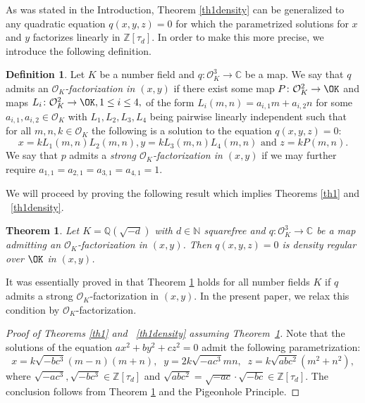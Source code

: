 \documentclass[11pt]{amsart}
\newtheorem{theorem}[lemma]{Theorem}
\theoremstyle{definition}
\newtheorem{definition}[lemma]{Definition}
\newcommand{\C}{{\mathbb C}}
\newcommand{\N}{{\mathbb N}}
\newcommand{\Q}{{\mathbb Q}}
\newcommand{\Z}{{\mathbb Z}}
\begin{document}
As was stated in the Introduction, Theorem \ref{th1density} can be generalized to any quadratic equation $q(x,y,z)=0$ for which the parametrized solutions for $x$ and $y$ factorizes linearly in  $\Z[\tau_{d}]$. In order to make this more precise, we introduce the following definition.
 
\begin{definition}
    Let $K$ be a number field and $q\colon\mathcal{O}_{K}^{3}\to\C$ be a map. We say that $q$ admits an \emph{$\mathcal{O}_{K}$-factorization in $(x,y)$} if there exist some map $P\colon \mathcal{O}_K^{2}\to \OK$ and maps $L_{i}\colon \mathcal{O}_{K}^{2}\to \OK, 1\leq i\leq 4,$ of the form $L_{i}(m,n)=a_{i,1}m+a_{i,2}n$ for some $a_{i,1},a_{i,2}\in\mathcal{O}_{K}$ with $L_{1}, L_2, L_3, L_{4}$ being pairwise linearly independent such that for all $m,n,k\in \mathcal{O}_{K}$ the following is a solution to the equation $q(x,y,z)=0$:
    $$x=kL_{1}(m,n)L_{2}(m,n), y=kL_{3}(m,n)L_{4}(m,n) \text{ and } z=kP(m,n).$$
    We say that $p$ admits a \emph{strong $\mathcal{O}_{K}$-factorization in $(x,y)$} if we may further require $a_{1,1}=a_{2,1}=a_{3,1}=a_{4,1}=1$.
\end{definition}

We will proceed by proving the following result which implies Theorems \ref{th1} and ~\ref{th1density}. 
 \begin{theorem}\label{thmain}
     Let $K=\Q(\sqrt{-d})$ with $d\in\N$ squarefree and $q\colon\mathcal{O}_{K}^{3}\to\C$ be a map admitting an $\mathcal{O}_{K}$-factorization in $(x,y)$.
     Then $q(x,y,z)=0$ is density regular over $\OK$ in $(x,y)$.    
 \end{theorem}

It was essentially proved in \cite{S23} that Theorem \ref{thmain} holds for all number fields $K$ if $q$ admits a strong $\mathcal{O}_{K}$-factorization in $(x,y)$. In the present paper, we relax this condition by $\mathcal{O}_{K}$-factorization.
\begin{proof}[Proof of Theorems \ref{th1} and ~\ref{th1density} assuming Theorem~\ref{thmain}]
    Note that the solutions of the equation $ax^{2}+by^{2}+cz^{2}=0$ admit the following parametrization:
    $$x=k\sqrt{-bc^{3}}(m-n)(m+n),\;\; y=2k\sqrt{-ac^{3}}mn,\;\; z=k\sqrt{abc^{2}}(m^{2}+n^{2}),$$
    where $\sqrt{-ac^{3}},\sqrt{-bc^{3}}\in\Z[\tau_{d}]$ and $\sqrt{abc^{2}}=\sqrt{-ac}\cdot\sqrt{-bc}\in\Z[\tau_{d}]$.
   The conclusion follows from Theorem \ref{thmain} and the Pigeonhole Principle.
\end{proof}
\end{document}
